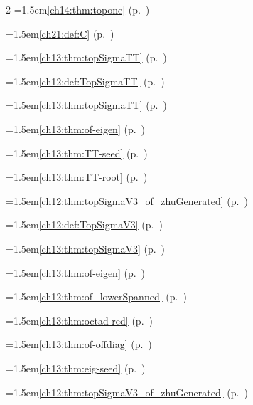 \begin{multicols}{2}
\hangindent=1.5em\quad \ref{ch14:thm:topone} (p.~\pageref{ch14:thm:topone})\par
\hangindent=1.5em\quad \ref{ch21:def:C} (p.~\pageref{ch21:def:C})\par
\hangindent=1.5em\quad \ref{ch13:thm:topSigmaTT} (p.~\pageref{ch13:thm:topSigmaTT})\par
\hangindent=1.5em\quad \ref{ch12:def:TopSigmaTT} (p.~\pageref{ch12:def:TopSigmaTT})\par
\hangindent=1.5em\quad \ref{ch13:thm:topSigmaTT} (p.~\pageref{ch13:thm:topSigmaTT})\par
\hangindent=1.5em\quad \ref{ch13:thm:of-eigen} (p.~\pageref{ch13:thm:of-eigen})\par
\hangindent=1.5em\quad \ref{ch13:thm:TT-seed} (p.~\pageref{ch13:thm:TT-seed})\par
\hangindent=1.5em\quad \ref{ch13:thm:TT-root} (p.~\pageref{ch13:thm:TT-root})\par
\hangindent=1.5em\quad \ref{ch12:thm:topSigmaV3_of_zhuGenerated} (p.~\pageref{ch12:thm:topSigmaV3_of_zhuGenerated})\par
\hangindent=1.5em\quad \ref{ch12:def:TopSigmaV3} (p.~\pageref{ch12:def:TopSigmaV3})\par
\hangindent=1.5em\quad \ref{ch13:thm:topSigmaV3} (p.~\pageref{ch13:thm:topSigmaV3})\par
\hangindent=1.5em\quad \ref{ch13:thm:of-eigen} (p.~\pageref{ch13:thm:of-eigen})\par
\hangindent=1.5em\quad \ref{ch12:thm:of_lowerSpanned} (p.~\pageref{ch12:thm:of_lowerSpanned})\par
\hangindent=1.5em\quad \ref{ch13:thm:octad-red} (p.~\pageref{ch13:thm:octad-red})\par
\hangindent=1.5em\quad \ref{ch13:thm:of-offdiag} (p.~\pageref{ch13:thm:of-offdiag})\par
\hangindent=1.5em\quad \ref{ch13:thm:eig-seed} (p.~\pageref{ch13:thm:eig-seed})\par
\hangindent=1.5em\quad \ref{ch12:thm:topSigmaV3_of_zhuGenerated} (p.~\pageref{ch12:thm:topSigmaV3_of_zhuGenerated})\par

\end{multicols}

